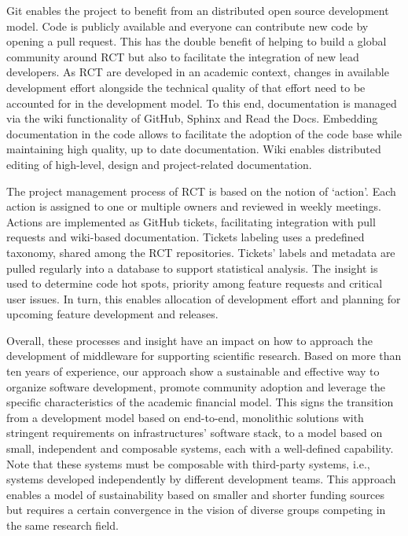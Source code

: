 \documentclass[preprint,12pt, a4paper]{elsarticle}
\begin{document}
Git enables the project to benefit from an distributed open source
development model. Code is publicly available and everyone can contribute new
code by opening a pull request. This has the double benefit of helping to
build a global community around RCT but also to facilitate the integration of
new lead developers. As RCT are developed in an academic context, changes in
available development effort alongside the technical quality of that effort
need to be accounted for in the development model. To this end, documentation
is managed via the wiki functionality of GitHub, Sphinx and Read the Docs.
Embedding documentation in the code allows to facilitate the adoption of the
code base while maintaining high quality, up to date documentation. Wiki
enables distributed editing of high-level, design and project-related
documentation.

The project management process of RCT is based on the notion of `action'.
Each action is assigned to one or multiple owners and reviewed in weekly
meetings. Actions are implemented as GitHub tickets, facilitating integration
with pull requests and wiki-based documentation. Tickets labeling uses a
predefined taxonomy, shared among the RCT repositories. Tickets' labels and
metadata are pulled regularly into a database to support statistical
analysis. The insight is used to determine code hot spots, priority among
feature requests and critical user issues. In turn, this enables allocation
of development effort and planning for upcoming feature development and
releases.

Overall, these processes and insight have an impact on how to approach the
development of middleware for supporting scientific research. Based on more
than ten years of experience, our approach show a sustainable and effective
way to organize software development, promote community adoption and leverage
the specific characteristics of the academic financial model. This signs the
transition from a development model based on end-to-end, monolithic solutions
with stringent requirements on infrastructures' software stack, to a model
based on small, independent and composable systems, each with a well-defined
capability. Note that these systems must be composable with third-party
systems, i.e., systems developed independently by different development
teams. This approach enables a model of sustainability based on smaller and
shorter funding sources but requires a certain convergence in the vision of
diverse groups competing in the same research field.


\end{document}
